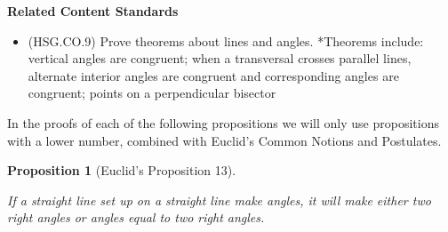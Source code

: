 \documentclass[
]{book}
\providecommand{\tightlist}{%
  \setlength{\itemsep}{0pt}\setlength{\parskip}{0pt}}
\newenvironment{standards}{}{}
\newtheorem{proposition}{Proposition}[chapter]
\theoremstyle{definition}
\theoremstyle{definition}
\theoremstyle{definition}
\theoremstyle{definition}
\theoremstyle{remark}
\begin{document}
\begin{standards}

\begin{center}
\textbf{Related Content Standards}

\end{center}

\begin{itemize}
\tightlist
\item
  (HSG.CO.9) Prove theorems about lines and angles. *Theorems include: vertical angles are congruent; when a transversal crosses parallel lines, alternate interior angles are congruent and corresponding angles are congruent; points on a perpendicular bisector
\end{itemize}

\end{standards}

In the proofs of each of the following propositions we will only use propositions with a lower number, combined with Euclid's Common Notions and Postulates.

\begin{proposition}[Euclid's Proposition 13]
\protect\hypertarget{prp:prop13}{}\label{prp:prop13}

If a straight line set up on a straight line make angles, it will make either two right angles or angles equal to two right angles.

\end{proposition}
\end{document}

